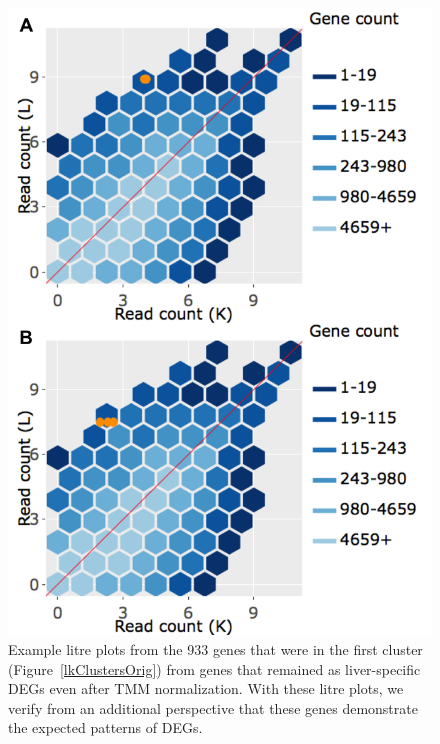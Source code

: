 \documentclass{article}
\begin{document}
  \null
  \begin{figure}[t!]
  \centerline{\includegraphics[width=0.7\columnwidth]{../MakeFigures/Dashboards/litreClusterOrig/litreClusterOrig.jpg}}
  \caption{Example litre plots from the 933 genes that were in the first cluster (Figure~\ref{lkClustersOrig}) from genes that remained as liver-specific DEGs even after TMM normalization. With these litre plots, we verify from an additional perspective that these genes demonstrate the expected patterns of DEGs.
  \label{litreClusterOrig}}
  \end{figure}
  
\end{document}
